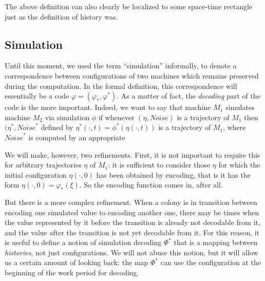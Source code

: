\documentclass[12pt]{memoir}
\def\B{B}
\newcommand{\Noise}{\mathit{Noise}}
\newcommand{\Tu}{T}
\newcommand{\cns}[1]{c_{\textrm{\upshape #1}}}
\newcommand{\cDamClearS}{\cns{dam-clear-s}}
\newcommand{\cDamClearT}{\cns{dam-clear-t}}
\newcommand{\cDamDist}[1]{\cns{dam-dist-\if#111\else\if#122\fi\fi}}
\begin{document}
\begin{definition}[Trajectory]

The above definition can also clearly be localized to some space-time
rectangle just as the definition of history was.
\end{definition}


\subsection{Simulation}

Until this moment, we used the term ``simulation'' informally, to denote
a correspondence between configurations of
two machines which remains preserved during the computation.
In the formal definition, this correspondence will essentially be a code
\( \varphi=(\varphi_{*},\varphi^{*}) \).
As a matter of fact, the \emph{decoding} part of the code is the more important.
Indeed, we want to say that machine \( M_{1} \) simulates machine \( M_{2} \) via
simulation \( \phi \) if whenever \( (\eta, \Noise) \) is a trajectory of \( M_{1} \) 
then \( (\eta^{*},\Noise^{*} \) 
defined by \( \eta^{*}(\cdot,t)=\phi^{*}(\eta(\cdot,t)) \) is a
trajectory of \( M_{1} \), where \( \Noise^{*} \) is computed by an appropriate



We will make, however, two refinements.
First, it is not important to require this for arbitrary trajectories \( \eta \) of \( M_{1} \):
it is sufficient to consider those \( \eta \) for which the initial configuration
 \( \eta(\cdot,0) \) has been obtained by encoding, that is it has the form 
\( \eta(\cdot,0)=\varphi_{*}(\xi) \).
So the encoding function comes in, after all.

But there is a more complex refinement.
When a colony is in transition between encoding one simulated value to encoding another one,
there may be times when the value represented by it before the transition
is already not decodable from it, and the value after the transition is not yet decodable from it.
For this reason, it is useful to define a notion of simulation decoding \( \Phi^{*} \)
that is a mapping between \emph{histories}, not just configurations.
We will not abuse this notion, but it will allow us a certain amount of looking back:
the map \( \Phi^{*} \) can use the configuration at the beginning of the work period for decoding.
\end{document}
